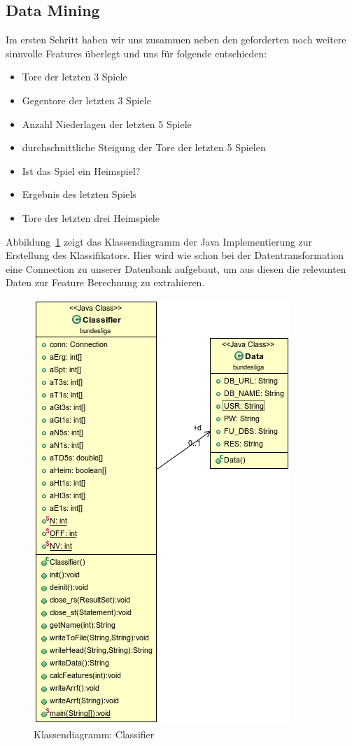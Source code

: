 \documentclass[
10pt,
a4paper
]{scrartcl}
\begin{document}
\subsection{Data Mining}

Im ersten Schritt haben wir uns zusammen neben den geforderten noch weitere sinnvolle Features überlegt und uns für folgende entschieden:

 \begin{itemize}
  \item Tore der letzten 3 Spiele
  \item Gegentore der letzten 3 Spiele
  \item Anzahl Niederlagen der letzten 5 Spiele
  \item durchschnittliche Steigung der Tore der letzten 5 Spielen
  \item Ist das Spiel ein Heimspiel?
  \item Ergebnis des letzten Spiels
  \item Tore der letzten drei Heimspiele
 \end{itemize}

Abbildung~\ref{fig:classi} zeigt das Klassendiagramm der Java Implementierung zur Erstellung des Klassifikators. Hier wird wie schon bei der Datentransformation eine Connection zu unserer Datenbank aufgebaut, um aus diesen die relevanten Daten zur Feature Berechnung zu extrahieren.\\

\begin{figure}[H]
\centering
  \includegraphics[scale=0.6]{Classifier.png}
\caption{Klassendiagramm: Classifier}
\label{fig:classi}
\end{figure}
\end{document}
